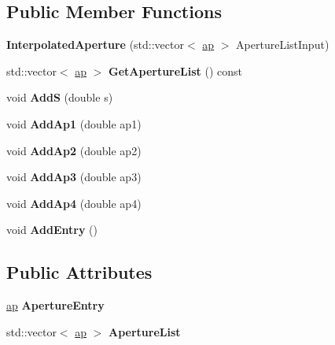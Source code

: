 \subsection*{Public Member Functions}
\begin{DoxyCompactItemize}
\item 
\mbox{\label{classInterpolatedAperture_aa9b9b9b96730b66406a8dfaab70d6a21}} 
{\bfseries Interpolated\+Aperture} (std\+::vector$<$ \hyperlink{structInterpolatedAperture_1_1ap}{ap} $>$ Aperture\+List\+Input)
\item 
\mbox{\label{classInterpolatedAperture_ac817b636d2b41c1e79d98a58bfdc3edb}} 
std\+::vector$<$ \hyperlink{structInterpolatedAperture_1_1ap}{ap} $>$ {\bfseries Get\+Aperture\+List} () const
\item 
\mbox{\label{classInterpolatedAperture_abf8bb1059594cc4a44e61d4ad1b8a4eb}} 
void {\bfseries AddS} (double s)
\item 
\mbox{\label{classInterpolatedAperture_a126708a073d5d3377ef2a0dd487abcc4}} 
void {\bfseries Add\+Ap1} (double ap1)
\item 
\mbox{\label{classInterpolatedAperture_a54c1d4e6108085e0915f2ba780c84eb7}} 
void {\bfseries Add\+Ap2} (double ap2)
\item 
\mbox{\label{classInterpolatedAperture_ae0da0812b465b3a4f47b4b71e6cbc48e}} 
void {\bfseries Add\+Ap3} (double ap3)
\item 
\mbox{\label{classInterpolatedAperture_a55bc70248b81962ba26f6742cbd90cf5}} 
void {\bfseries Add\+Ap4} (double ap4)
\item 
\mbox{\label{classInterpolatedAperture_ab8528e3dc333878fcc60da4dce59153d}} 
void {\bfseries Add\+Entry} ()
\end{DoxyCompactItemize}
\subsection*{Public Attributes}
\begin{DoxyCompactItemize}
\item 
\mbox{\label{classInterpolatedAperture_a964e06523f8e53d85015679d77b1c508}} 
\hyperlink{structInterpolatedAperture_1_1ap}{ap} {\bfseries Aperture\+Entry}
\item 
\mbox{\label{classInterpolatedAperture_a93beb0c191f55f74ac45bedad8209334}} 
std\+::vector$<$ \hyperlink{structInterpolatedAperture_1_1ap}{ap} $>$ {\bfseries Aperture\+List}
\end{DoxyCompactItemize}



